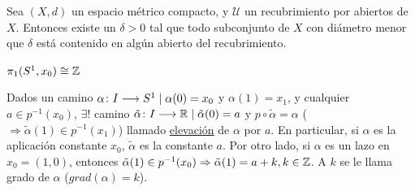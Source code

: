 \documentclass[GTSResumen.tex]{subfiles}
\begin{document}
\begin{lemma} Sea $(X,d)$ un espacio métrico compacto, y $\mathcal{U}$ un recubrimiento por abiertos de $X$. Entonces existe un $\delta>0$ tal que todo subconjunto de $X$ con diámetro menor que $\delta$ está contenido en algún abierto del recubrimiento.
\end{lemma}

\begin{teorema}
$\pi_1(S^1,x_0)\cong\mathbb{Z}$
\end{teorema}
\begin{defi}Dados un camino $\alpha\colon{I}\longrightarrow{S^1}\mid\alpha(0)=x_0$ y $\alpha(1)=x_1$, y cualquier $a\in p^{-1}(x_0)$, $\exists!$ camino $\tilde{\alpha}\colon{I}\longrightarrow{\mathbb{R}}\mid\tilde{\alpha}(0)=a$ y $p\circ\tilde{\alpha}=\alpha$ ($\Rightarrow \tilde{\alpha}(1)\in p^{-1}(x_1)$) llamado \underline{elevación} de $\alpha$ por $a$. En particular, si $\alpha$ es la aplicación constante $x_0$, $\tilde{\alpha}$ es la constante $a$. Por otro lado, si $\alpha$ es un lazo en $x_0=(1,0)$, entonces $\tilde{\alpha}(1)\in p^{-1}(x_0)\Rightarrow\tilde{\alpha}(1)=a+k, k\in\mathbb{Z}$. A $k$ se le llama grado de $\alpha$ ($grad(\alpha)=k$).
\end{defi}
\end{document}
